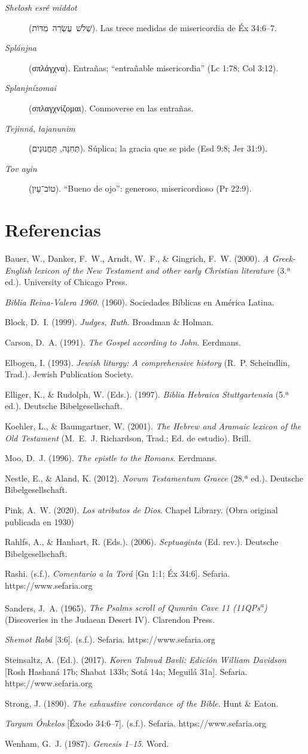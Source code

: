 \documentclass[11pt,letterpaper]{article}
\newcommand{\heb}[1]{\mbox{\foreignlanguage{hebrew}{#1}}}
\newcommand{\grc}[1]{\foreignlanguage{ancientgreek}{#1}}
\newcommand{\refapa}[1]{\par{\RaggedRight\hangindent=1.27cm\hangafter=1\noindent #1\par}\vspace{4pt}}
\begin{document}
\begin{description}
\item[\emph{Shelosh esré middot}] (\heb{שְׁלֹשׁ עֶשְׂרֵה מִדּוֹת}). Las trece medidas de misericordia de Éx 34:6--7.
\item[\emph{Splánjna}] (\grc{σπλάγχνα}). Entrañas; ``entrañable misericordia'' (Lc 1:78; Col 3:12).
\item[\emph{Splanjnízomai}] (\grc{σπλαγχνίζομαι}). Conmoverse en las entrañas.
\item[\emph{Tejinná}, \emph{tajanunim}] (\heb{תְּחִנָּה}, \heb{תַּחֲנוּנִים}). Súplica; la gracia que se pide (Esd 9:8; Jer 31:9).
\item[\emph{Tov ayin}] (\heb{טוֹב־עַיִן}). ``Bueno de ojo'': generoso, misericordioso (Pr 22:9).
\end{description}

\section*{Referencias}
\refapa{Bauer, W., Danker, F.~W., Arndt, W.~F., \& Gingrich, F.~W. (2000). \emph{A Greek-English lexicon of the New Testament and other early Christian literature} (3.ª ed.). University of Chicago Press.}
\refapa{\emph{Biblia Reina-Valera 1960}. (1960). Sociedades Bíblicas en América Latina.}
\refapa{Block, D.~I. (1999). \emph{Judges, Ruth}. Broadman \& Holman.}
\refapa{Carson, D.~A. (1991). \emph{The Gospel according to John}. Eerdmans.}
\refapa{Elbogen, I. (1993). \emph{Jewish liturgy: A comprehensive history} (R.~P. Scheindlin, Trad.). Jewish Publication Society.}
\refapa{Elliger, K., \& Rudolph, W. (Eds.). (1997). \emph{Biblia Hebraica Stuttgartensia} (5.ª ed.). Deutsche Bibelgesellschaft.}
\refapa{Koehler, L., \& Baumgartner, W. (2001). \emph{The Hebrew and Aramaic lexicon of the Old Testament} (M.~E.~J. Richardson, Trad.; Ed. de estudio). Brill.}
\refapa{Moo, D.~J. (1996). \emph{The epistle to the Romans}. Eerdmans.}
\refapa{Nestle, E., \& Aland, K. (2012). \emph{Novum Testamentum Graece} (28.ª ed.). Deutsche Bibelgesellschaft.}
\refapa{Pink, A.~W. (2020). \emph{Los atributos de Dios}. Chapel Library. (Obra original publicada en 1930)}
\refapa{Rahlfs, A., \& Hanhart, R. (Eds.). (2006). \emph{Septuaginta} (Ed. rev.). Deutsche Bibelgesellschaft.}
\refapa{Rashi. (s.f.). \emph{Comentario a la Torá} [Gn 1:1; Éx 34:6]. Sefaria. https://www.sefaria.org}
\refapa{Sanders, J.~A. (1965). \emph{The Psalms scroll of Qumrân Cave 11 (11QPs\textsuperscript{a})} (Discoveries in the Judaean Desert IV). Clarendon Press.}
\refapa{\emph{Shemot Rabá} [3:6]. (s.f.). Sefaria. https://www.sefaria.org}
\refapa{Steinsaltz, A. (Ed.). (2017). \emph{Koren Talmud Bavli: Edición William Davidson} [Rosh Hashaná 17b; Shabat 133b; Sotá 14a; Meguilá 31a]. Sefaria. https://www.sefaria.org}
\refapa{Strong, J. (1890). \emph{The exhaustive concordance of the Bible}. Hunt \& Eaton.}
\refapa{\emph{Targum Ónkelos} [Éxodo 34:6--7]. (s.f.). Sefaria. https://www.sefaria.org}
\refapa{Wenham, G.~J. (1987). \emph{Genesis 1--15}. Word.}
\end{document}
